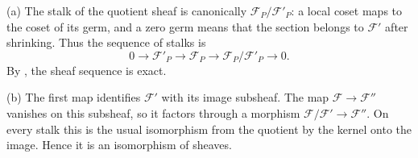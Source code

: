 (a) The stalk of the quotient sheaf is canonically $\mathscr F_P/\mathscr F'_P$: a local coset maps to the coset of its germ, and a zero germ means that the section belongs to $\mathscr F'$ after shrinking. Thus the sequence of stalks is
\[0\to\mathscr F'_P\to\mathscr F_P\to\mathscr F_P/\mathscr F'_P\to0.\]
By , the sheaf sequence is exact.

(b) The first map identifies $\mathscr F'$ with its image subsheaf. The map $\mathscr F\to\mathscr F''$ vanishes on this subsheaf, so it factors through a morphism $\mathscr F/\mathscr F'\to\mathscr F''$. On every stalk this is the usual isomorphism from the quotient by the kernel onto the image. Hence it is an isomorphism of sheaves.
